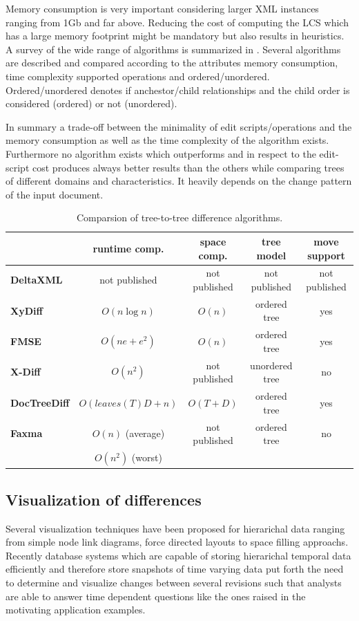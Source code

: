 Memory consumption is very important considering larger XML instances ranging from 1Gb and far above. Reducing the cost of computing the LCS which has a large memory footprint might be mandatory but also results in heuristics. A survey of the wide range of algorithms is summarized in \cite{cobena2002comparative}. Several algorithms are described and compared according to the attributes memory consumption, time complexity supported operations and ordered/unordered. Ordered/unordered denotes if anchestor/child relationships and the child order is considered (ordered) or not (unordered). 

In summary a trade-off between the minimality of edit scripts/operations and the memory consumption as well as the time complexity of the algorithm exists. Furthermore no algorithm exists which outperforms and in respect to the edit-script cost produces always better results than the others while comparing trees of different domains and characteristics. It heavily depends on the change pattern of the input document.

\begin{table}[tb]
\centering 
\begin{tabular}[r]{|l|c|c|c|c|} 
\hline
& \textbf{runtime comp.} & \textbf{space comp.} & \textbf{tree model} & \textbf{move support}\\
\hline
\hline
\textbf{DeltaXML} & not published & not published & not published & not published\\
\hline
\textbf{XyDiff} & $O(n \log n)$ & $O(n)$ & ordered tree & yes\\
\hline
\textbf{FMSE} & $O(n e + e^2)$ & $O(n)$ & ordered tree & yes\\
\hline
\textbf{X-Diff} & $O(n^2)$ & not published & unordered tree & no\\
\hline
\textbf{DocTreeDiff} & $O(leaves(T)D + n)$ & $O(T+D)$ & ordered tree & yes\\
\hline
\textbf{Faxma} & $O(n)$ (average) & not published & ordered tree & no\\
& $O(n^2)$ (worst) &  & & \\
\hline
\end{tabular}
\label{chap2:comparsion}
\vspace{0.5em} 
\caption{Comparsion of tree-to-tree difference algorithms.}
\end{table}

\subsection{Visualization of differences}
Several visualization techniques have been proposed for hierarichal data ranging from simple node link diagrams, force directed layouts to space filling approachs. Recently database systems which are capable of storing hierarichal temporal data efficiently and therefore store snapshots of time varying data put forth the need to determine and visualize changes between several revisions such that analysts are able to answer time dependent questions like the ones raised in the motivating application examples.

